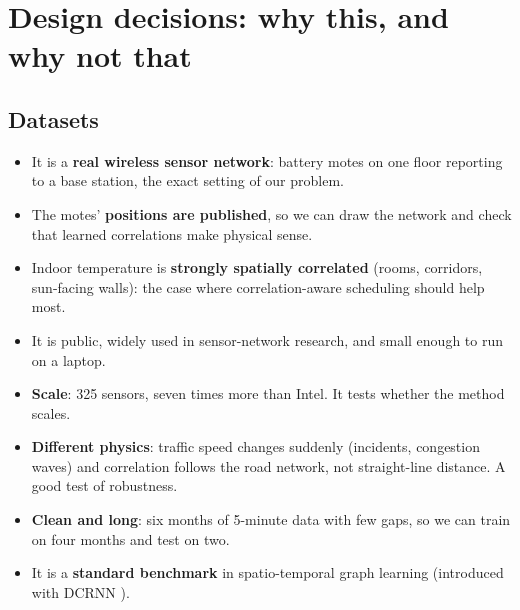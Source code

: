 \section{Design decisions: why this, and why not that}

\subsection{Datasets}

\begin{whybox}
\begin{itemize}
  \item It is a \textbf{real wireless sensor network}: battery motes on one floor reporting to a base station, the
        exact setting of our problem.
  \item The motes' \textbf{positions are published}, so we can draw the network and check that learned correlations
        make physical sense.
  \item Indoor temperature is \textbf{strongly spatially correlated} (rooms, corridors, sun-facing walls): the
        case where correlation-aware scheduling should help most.
  \item It is public, widely used in sensor-network research, and small enough to run on a laptop.
\end{itemize}
\end{whybox}

\begin{whybox}
\begin{itemize}
  \item \textbf{Scale}: 325 sensors, seven times more than Intel. It tests whether the method scales.
  \item \textbf{Different physics}: traffic speed changes suddenly (incidents, congestion waves) and correlation
        follows the road network, not straight-line distance. A good test of robustness.
  \item \textbf{Clean and long}: six months of 5-minute data with few gaps, so we can train on four months and test
        on two.
  \item It is a \textbf{standard benchmark} in spatio-temporal graph learning (introduced with DCRNN \cite{24}).
\end{itemize}
\end{whybox}

